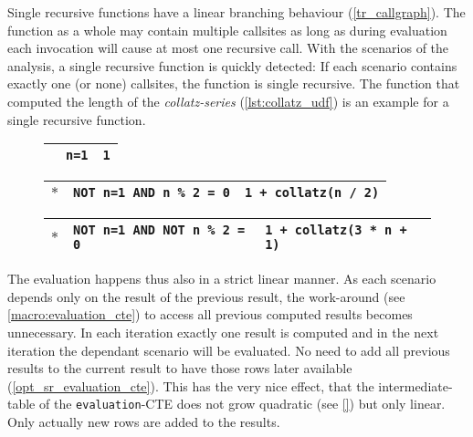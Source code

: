 Single recursive functions have a linear branching behaviour (\autoref{tr_callgraph}). The function as a whole may contain multiple callsites as long as during evaluation each invocation will cause at most one recursive call. With the scenarios of the analysis, a single recursive function is quickly detected: If each scenario contains exactly one (or none) callsites, the function is single recursive.
The function that computed the length of the \textit{collatz-series} (\autoref{lst:collatz_udf}) is an example for a single recursive function.

\begin{figure}[h]
    \centering
    \begin{minipage}[b]{.45\linewidth}
    \centering
    \label{lst:collatz_udf}
    \end{minipage}
    \begin{minipage}[b]{.5\linewidth}
    \centering\scriptsize
        \begin{tabular}{|p{1em}|p{3.3cm}|p{2.9cm}|}\hline
        \cellcolor{gray!25} & \texttt{\phantom{NOT }n=1} & \texttt{1}\\\hline
        \end{tabular}
        
        \begin{tabular}{|p{1em}|p{3.3cm}|p{2.9cm}|}\hline
        \cellcolor{gray!25} $\ast$ & \texttt{NOT n=1 AND \phantom{NOT }n \% 2 = 0} & \texttt{1 + collatz(n / 2)}\\\hline
        \end{tabular}
        
        \begin{tabular}{|p{1em}|p{3.3cm}|p{2.9cm}|}\hline
        \cellcolor{gray!25} $\ast$ & \texttt{NOT n=1 AND NOT n \% 2 = 0} & \texttt{1 + collatz(3 * n + 1)}\\\hline
        \end{tabular}
        \vspace{2em}
    \label{collatz_scenarios}
    \end{minipage}
    \caption{}
    \label{collatz_sql_with_scenarios}
\end{figure}

The evaluation happens thus also in a strict linear manner. As each scenario depends only on the result of the previous result, the work-around (see \autoref{macro:evaluation_cte}) to access all previous computed results becomes unnecessary. In each iteration exactly one result is computed and in the next iteration the dependant scenario will be evaluated. No need to add all previous results to the current result to have those rows later available (\autoref{opt_sr_evaluation_cte}). This has the very nice effect, that the intermediate-table of the \texttt{evaluation}-CTE does not grow quadratic (see \autoref{}) but only linear. Only actually new rows are added to the results.

